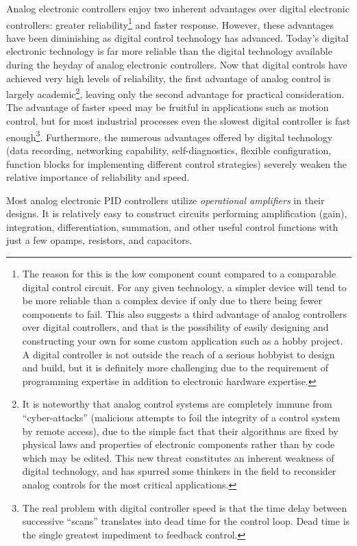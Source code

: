 Analog electronic controllers enjoy two inherent advantages over digital electronic controllers: greater reliability\footnote{The reason for this is the low component count compared to a comparable digital control circuit.  For any given technology, a simpler device will tend to be more reliable than a complex device if only due to there being fewer components to fail.  This also suggests a third advantage of analog controllers over digital controllers, and that is the possibility of easily designing and constructing your own for some custom application such as a hobby project.  A digital controller is not outside the reach of a serious hobbyist to design and build, but it is definitely more challenging due to the requirement of programming expertise in addition to electronic hardware expertise.} and faster response.  However, these advantages have been diminishing as digital control technology has advanced.  Today's digital electronic technology is far more reliable than the digital technology available during the heyday of analog electronic controllers.  Now that digital controls have achieved very high levels of reliability, the first advantage of analog control is largely academic\footnote{It is noteworthy that analog control systems are completely immune from ``cyber-attacks'' (malicious attempts to foil the integrity of a control system by remote access), due to the simple fact that their algorithms are fixed by physical laws and properties of electronic components rather than by code which may be edited.  This new threat constitutes an inherent weakness of digital technology, and has spurred some thinkers in the field to reconsider analog controls for the most critical applications.}, leaving only the second advantage for practical consideration.  The advantage of faster speed may be fruitful in applications such as motion control, but for most industrial processes even the slowest digital controller is fast enough\footnote{The real problem with digital controller speed is that the time delay between successive ``scans'' translates into dead time for the control loop.  Dead time is the single greatest impediment to feedback control.}.  Furthermore, the numerous advantages offered by digital technology (data recording, networking capability, self-diagnostics, flexible configuration, function blocks for implementing different control strategies) severely weaken the relative importance of reliability and speed.

Most analog electronic PID controllers utilize \textit{operational amplifiers} in their designs.  It is relatively easy to construct circuits performing amplification (gain), integration, differentiation, summation, and other useful control functions with just a few opamps, resistors, and capacitors.






